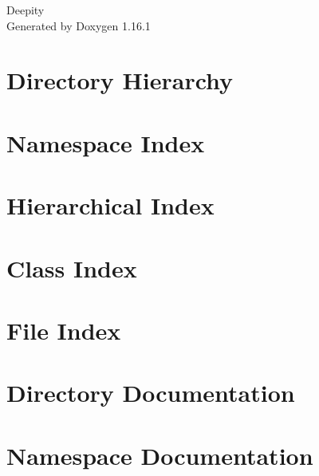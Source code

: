 \documentclass[twoside]{book}
\newcommand{\+}{\discretionary{\mbox{\scriptsize$\hookleftarrow$}}{}{}}
\newcommand{\clearemptydoublepage}{%
    \newpage{\pagestyle{empty}\cleardoublepage}%
  }
\begin{document}
  \raggedbottom
    \hypersetup{pageanchor=false,
                bookmarksnumbered=true,
                pdfencoding=unicode
               }
  \begin{titlepage}
  \vspace*{7cm}
  \begin{center}%
  {\Large Deepity}\\
  \vspace*{1cm}
  {\large Generated by Doxygen 1.16.1}\\
  \end{center}
  \end{titlepage}
  \clearemptydoublepage
  \tableofcontents
  \clearemptydoublepage
  \hypersetup{pageanchor=true}


\chapter{Directory Hierarchy}

\chapter{Namespace Index}

\chapter{Hierarchical Index}

\chapter{Class Index}

\chapter{File Index}

\chapter{Directory Documentation}






\chapter{Namespace Documentation}


\end{document}
